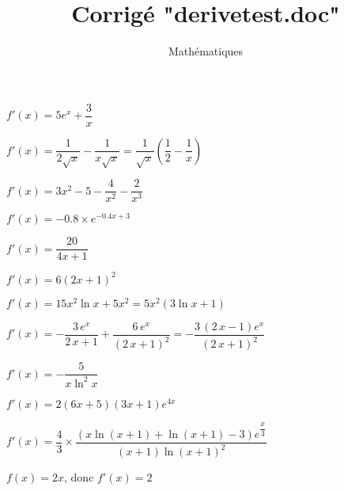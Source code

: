 \documentclass[a4paper,12pt]{scrartcl}
\date{}
\title{Corrigé "derivetest.doc"}
\author{Mathématiques}
\begin{document}
\maketitle


\question{} $f'(x) = 5e^{x} + \dfrac{3}{x}$

\question{} $f'(x) = \dfrac{1}{2 \sqrt{x}} - \dfrac{1}{x \sqrt{x}} = \dfrac{1}{\sqrt{x}} \left( \dfrac{1}{2} - \dfrac{1}{x} \right)$

\question{} $f'(x) = 3x^2 - 5 - \dfrac{4}{x^2} - \dfrac{2}{x^3}$



\question{} $f'(x) = -0.8 \times e^{-0.4x+3}$

\question{} $f'(x) = \dfrac{20}{4x+1}$

\question{} $f'(x) = 6(2x+1)^2$



\question{} $f'(x) = 15x^2 \ln x + 5x^2 = 5x^2 (3 \ln x + 1)$

\question{} $f'(x) = -\dfrac{3 \, e^{x}}{2 \, x + 1} + \dfrac{6 \, e^{x}}{{\left(2 \, x + 1\right)}^{2}} = -\dfrac{3 \, {\left(2 \, x - 1\right)} e^{x}}{{\left(2 \, x + 1\right)}^{2}}
$

\question{} $f'(x) = -\dfrac{5}{x \ln^2 x}$



\question{} $f'(x) = 2(6x + 5)(3x + 1)e^{4x}$

\question{} $f'(x) = \dfrac{4}{3} \times \dfrac{(x \ln(x + 1) + \ln(x + 1) - 3)e^{\dfrac{x}{3}}}{(x + 1)\ln(x + 1)^2}$

\question{} $f(x) = 2x$, donc $f'(x) = 2$
\end{document}
